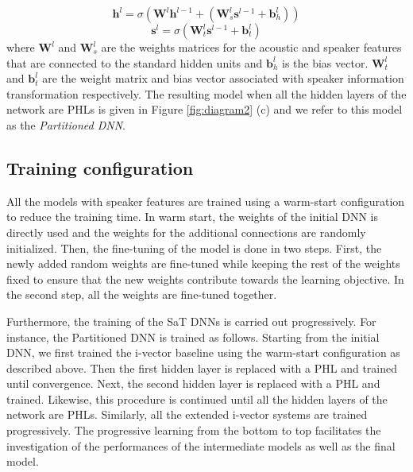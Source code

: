 \documentclass[a4paper]{article}
\begin{document}
 \begin{equation}
 \label{partitioned_standard}
 \mathbf{h}^l = \sigma (\mathbf{W}^l \mathbf{h}^{l-1}+ (\mathbf{W}_s^l \mathbf{s}^{l-1} + \mathbf{b}_{h}^l ))
 \end{equation}
 \begin{equation}
 \label{partitioned_speaker}
 \mathbf{s}^l = \sigma (\mathbf{W}_t^l \mathbf{s}^{l-1}+ \mathbf{b}_{t}^l )
 \end{equation} where $\mathbf{W}^l$ and   $\mathbf{W}_s^l$ are the weights matrices for the acoustic and speaker features that are connected to the standard hidden units and $\mathbf{b}_{h}^l$ is the bias vector. $\mathbf{W}_t^l$ and $\mathbf{b}_{t}^l$ are the weight matrix and bias vector associated with speaker information transformation respectively. The resulting model when all the hidden layers of the network are PHLs is given in Figure \ref{fig:diagram2} (c) and we refer to this model as the \emph{Partitioned DNN}.

\subsection{Training configuration}

 All the models with speaker features are trained using a warm-start configuration to reduce the training time. In warm start,  the weights of the initial DNN is directly used and the weights for the additional connections are randomly initialized. Then, the fine-tuning of the model is done in two steps. First, the newly added random weights are fine-tuned while keeping the rest of the weights fixed to ensure that the new weights contribute towards the learning objective. In the second step, all the weights are fine-tuned together.  
 
 Furthermore, the training of the SaT DNNs is carried out progressively. For instance, the Partitioned DNN is trained as follows.  Starting from the initial DNN, we first trained the i-vector  baseline using the warm-start configuration as described above.  Then the first hidden layer is replaced with a PHL and trained until convergence. Next,  the second hidden layer is replaced with a PHL and trained.  Likewise, this procedure is continued until all the hidden layers of the network are PHLs.  Similarly, all the extended i-vector systems are trained progressively. The progressive learning from the bottom to top facilitates the investigation of  the  performances of the intermediate models as well as the final model. 
\end{document}
